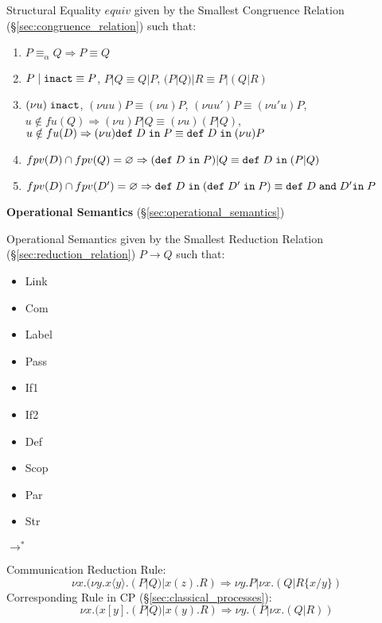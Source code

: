 Structural Equality $equiv$ given by the Smallest Congruence Relation
(\S\ref{sec:congruence_relation}) such that:
\begin{enumerate}
  \item $P \equiv_\alpha Q \Rightarrow P \equiv Q$
  \item $P \;|\; \mathtt{inact} \equiv P$, \quad\quad $P | Q \equiv Q
    | P$, \quad\quad $(P|Q)|R \equiv P|(Q|R)$
  \item $(\nu u) \; \mathtt{inact}$, \quad
    $(\nu u u)P \equiv (\nu u)P$, \quad
    $(\nu u u')P \equiv (\nu u' u)P$, \\
    $u \notin fu(Q) \Rightarrow (\nu u)P | Q \equiv (\nu u)(P|Q)$, \\
    $u \notin fu(D) \Rightarrow
    (\nu u) \mathtt{def} \; D \; \mathtt{in} \; P
    \equiv \mathtt{def} \; D \; \mathtt{in} \; (\nu u)P$
  \item $fpv(D) \cap fpv(Q) = \varnothing \Rightarrow
    (\mathtt{def} \; D \; \mathtt{in} \; P) | Q
    \equiv \mathtt{def} \; D \; \mathtt{in} \; (P|Q)$
  \item $fpv(D) \cap fpv(D') = \varnothing \Rightarrow
    \mathtt{def} \; D \; \mathtt{in} \;
    (\mathtt{def} \; D' \; \mathtt{in} \; P)
    \equiv \mathtt{def} \; D \; \mathtt{and} \; D' \mathtt{in} \; P$
\end{enumerate}


\textbf{Operational Semantics} (\S\ref{sec:operational_semantics})
\cite{honda-vasconcelos-kubo98}

Operational Semantics given by the Smallest Reduction Relation
(\S\ref{sec:reduction_relation}) $P \rightarrow Q$ such that:

\begin{itemize}
  \item Link
  \item Com
  \item Label
  \item Pass
  \item If1
  \item If2
  \item Def
  \item Scop
  \item Par
  \item Str
\end{itemize}

$\rightarrow^*$

Communication Reduction Rule: \cite{wadler12}
\[
  \nu x.(\nu y.x\langle y \rangle.(P|Q)|x(z).R) \Longrightarrow
    \nu y.P|\nu x.(Q|R\{x/y\})
\]
Corresponding Rule in CP (\S\ref{sec:classical_processes}):
\[
  \nu x.(x[y].(P|Q) | x(y).R) \Longrightarrow
    \nu y.(P|\nu x.(Q|R))
\]


